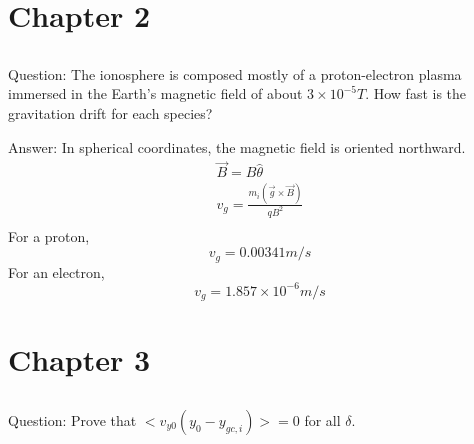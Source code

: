 \documentclass{article}
\begin{document}
\section{Chapter 2}
\subsection{}
\subsection{}
Question: The ionosphere is composed mostly of a proton-electron plasma immersed in the Earth's magnetic field of about $3\times 10^{-5} T$. How fast is the gravitation drift for each species?

Answer:
In spherical coordinates, the magnetic field is oriented northward.
\begin{eqnarray*}
    \vec{B}=B\hat{\theta}\\
    v_g=\frac{m_i(\vec{g}\times \vec{B})}{qB^2}\\
\end{eqnarray*}
For a proton,
\begin{equation}
    v_g=0.00341 m/s
\end{equation}
For an electron,
\begin{equation}
    v_g=1.857\times 10^{-6} m/s
\end{equation}
\section{Chapter 3}
\subsection{}
Question: Prove that $<v_{y0}(y_0-y_{gc,i})>=0$ for all $\delta$.
\end{document}
